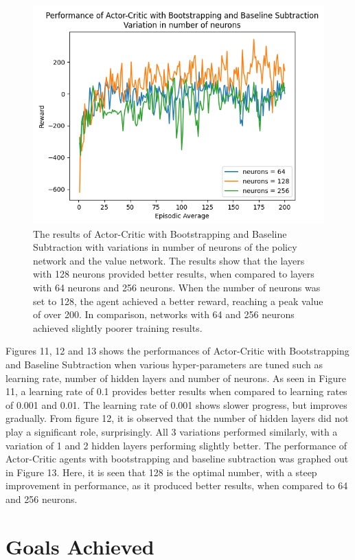 \documentclass{article}
\begin{document}
\begin{figure}[h!]
\centering
\includegraphics[width=0.85\linewidth]{Report/images/12.Performance_of_Actor_Critic_BSandBS_Neurons.png}
\caption{\label{fig:ActorCriticBS2-different hidden layers}The results of Actor-Critic with Bootstrapping and Baseline Subtraction with variations in number of neurons of the policy network and the value network. The results show that the layers with 128 neurons provided better results, when compared to layers with 64 neurons and 256 neurons. When the number of neurons was set to 128, the agent achieved a better reward, reaching a peak value of over 200. In comparison, networks with 64 and 256 neurons achieved slightly poorer training results.}
\end{figure}
Figures 11, 12 and 13 shows the performances of Actor-Critic with Bootstrapping and Baseline Subtraction when various hyper-parameters are tuned such as learning rate, number of hidden layers and number of neurons. 
As seen in Figure 11,  a learning rate of 0.1 provides better results when compared to learning rates of 0.001 and 0.01. The learning rate of 0.001 shows slower progress, but improves gradually. From figure 12, it is observed that the number of hidden layers did not play a significant role, surprisingly. All 3 variations performed similarly, with a variation of 1 and 2 hidden layers performing slightly better. The performance of Actor-Critic agents with bootstrapping and baseline subtraction was graphed out in Figure 13. Here, it is seen that 128 is the optimal number, with a steep improvement in performance, as it produced better results, when compared to 64 and 256 neurons. 
\section{Goals Achieved}
\end{document}
